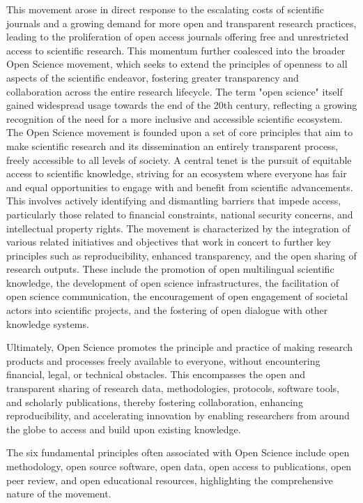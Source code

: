 \documentclass{article}
\begin{document}
This movement arose in direct response to the escalating costs of scientific journals and a growing demand for more open and transparent research practices, leading to the proliferation of open access journals offering free and unrestricted access to scientific research. This momentum further coalesced into the broader Open Science movement, which seeks to extend the principles of openness to all aspects of the scientific endeavor, fostering greater transparency and collaboration across the entire research lifecycle. The term "open science" itself gained widespread usage towards the end of the 20th century, reflecting a growing recognition of the need for a more inclusive and accessible scientific ecosystem. The Open Science movement is founded upon a set of core principles that aim to make scientific research and its dissemination an entirely transparent process, freely accessible to all levels of society. A central tenet is the pursuit of equitable access to scientific knowledge, striving for an ecosystem where everyone has fair and equal opportunities to engage with and benefit from scientific advancements. This involves actively identifying and dismantling barriers that impede access, particularly those related to financial constraints, national security concerns, and intellectual property rights. The movement is characterized by the integration of various related initiatives and objectives that work in concert to further key principles such as reproducibility, enhanced transparency, and the open sharing of research outputs. These include the promotion of open multilingual scientific knowledge, the development of open science infrastructures, the facilitation of open science communication, the encouragement of open engagement of societal actors into scientific projects, and the fostering of open dialogue with other knowledge systems.

Ultimately, Open Science promotes the principle and practice of making research products and processes freely available to everyone, without encountering financial, legal, or technical obstacles. This encompasses the open and transparent sharing of research data, methodologies, protocols, software tools, and scholarly publications, thereby fostering collaboration, enhancing reproducibility, and accelerating innovation by enabling researchers from around the globe to access and build upon existing knowledge.

The six fundamental principles often associated with Open Science include open methodology, open source software, open data, open access to publications, open peer review, and open educational resources, highlighting the comprehensive nature of the movement.
\end{document}
